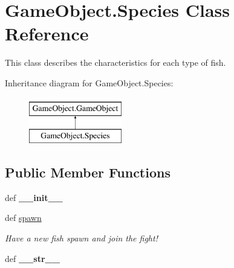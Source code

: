\hypertarget{classGameObject_1_1Species}{\section{\-Game\-Object.\-Species \-Class \-Reference}
\label{classGameObject_1_1Species}
}


\-This class describes the characteristics for each type of fish.  


\-Inheritance diagram for \-Game\-Object.\-Species\-:\begin{figure}[H]
\begin{center}
\leavevmode
\includegraphics[height=2.000000cm]{classGameObject_1_1Species}
\end{center}
\end{figure}
\subsection*{\-Public \-Member \-Functions}
\begin{DoxyCompactItemize}
\item 
\hypertarget{classGameObject_1_1Species_a92aca0bece4b9c3d03a8cfc6094b9096}{def {\bfseries \-\_\-\-\_\-init\-\_\-\-\_\-}}\label{classGameObject_1_1Species_a92aca0bece4b9c3d03a8cfc6094b9096}

\item 
\hypertarget{classGameObject_1_1Species_aecc795f1e9bd8d0eeecd63cfa9b038c8}{def \hyperlink{classGameObject_1_1Species_aecc795f1e9bd8d0eeecd63cfa9b038c8}{spawn}}\label{classGameObject_1_1Species_aecc795f1e9bd8d0eeecd63cfa9b038c8}

\begin{DoxyCompactList}\small\item\em \-Have a new fish spawn and join the fight! \end{DoxyCompactList}\item 
\hypertarget{classGameObject_1_1Species_aa67039c45f56170a46f756635a0e6809}{def {\bfseries \-\_\-\-\_\-str\-\_\-\-\_\-}}\label{classGameObject_1_1Species_aa67039c45f56170a46f756635a0e6809}

\end{DoxyCompactItemize}
